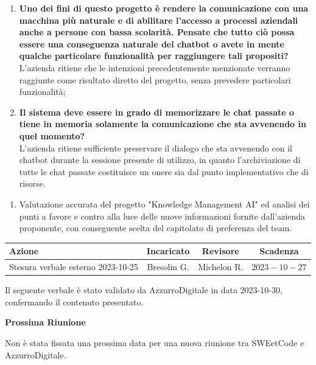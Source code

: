 \documentclass{article}
\begin{document}
\begin{paracol}{2}
\begin{enumerate}
    \item\textbf{Uno dei fini di questo progetto è rendere la comunicazione con una macchina più naturale e di abilitare l'accesso a processi aziendali anche a persone con bassa scolarità. Pensate che tutto ciò possa essere una conseguenza naturale del chatbot o avete in mente qualche particolare funzionalità per raggiungere tali propositi?} \\L'azienda ritiene che le intenzioni precedentemente menzionate verranno raggiunte come risultato diretto del progetto, senza prevedere particolari funzionalità;
    \item\textbf{Il sistema deve essere in grado di memorizzare le chat passate o tiene in memoria solamente la comunicazione che sta avvenendo in quel momento?} \\L'azienda ritiene sufficiente preservare il dialogo che sta avvenendo con il chatbot durante la sessione presente di utilizzo, in quanto l'archiviazione di tutte le chat passate costituisce un onere sia dal punto implementativo che di risorse.
\end{enumerate}

\vspace{1.6cm}

\begin{enumerate}
    \item 
    Valutazione accurata del progetto "Knowledge Management AI" ed analisi dei punti a favore e contro alla luce delle nuove informazioni fornite dall'azienda proponente, con conseguente scelta del capitolato di preferenza del team.
\end{enumerate}

\end{paracol}

\vspace{3cm}

{\renewcommand{\arraystretch}{1.5}
\begin{tabularx}{\textwidth}{X|c|c|c}
\textbf{Azione} & \textbf{Incaricato} & \textbf{Revisore} & \textbf{Scadenza} \\
\hline
Stesura verbale esterno 2023-10-25 & Bresolin G. & Michelon R. & $2023-10-27$ \\
\end{tabularx}}

\vspace{3em}


Il seguente verbale è stato validato da AzzurroDigitale in data 2023-10-30, confermando il contenuto presentato.

\textbf{Prossima Riunione}

Non è stata fissata una prossima data per una nuova riunione tra SWEetCode e AzzurroDigitale. 
\end{document}
